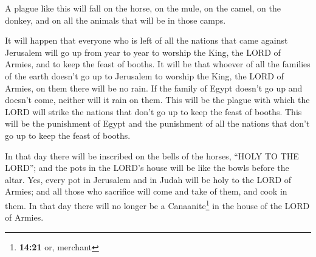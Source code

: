  A plague like this will fall on the horse, on the mule,
on the camel, on the donkey, and on all the animals that will be in
those camps.

 It will happen that everyone who is left of all the
nations that came against Jerusalem will go up from year to year to
worship the King, the LORD of Armies, and to keep the feast of booths.
 It will be that whoever of all the families of the earth
doesn't go up to Jerusalem to worship the King, the LORD of Armies, on
them there will be no rain.  If the family of Egypt
doesn't go up and doesn't come, neither will it rain on them. This will
be the plague with which the LORD will strike the nations that don't go
up to keep the feast of booths.  This will be the
punishment of Egypt and the punishment of all the nations that don't go
up to keep the feast of booths.

 In that day there will be inscribed on the bells of the
horses, ``HOLY TO THE LORD''; and the pots in the LORD's house will be
like the bowls before the altar.  Yes, every pot in
Jerusalem and in Judah will be holy to the LORD of Armies; and all those
who sacrifice will come and take of them, and cook in them. In that day
there will no longer be a Canaanite\footnote{\textbf{14:21} or, merchant}
in the house of the LORD of Armies.
